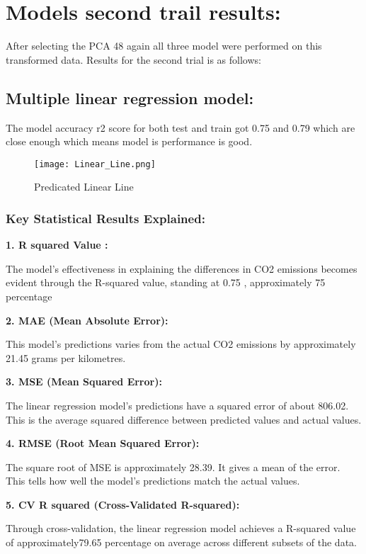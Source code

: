 \documentclass[12pt, a4paper,oneside]{book}
\numberwithin{equation}{section}
\begin{document}
\section{Models second trail results:}

After selecting the PCA 48 again all three model were performed on this transformed data. Results for the second trial is as follows:
\subsection{Multiple linear regression model:}

The model accuracy r2 score  for both test and train got 0.75 and 0.79 which are close enough which means model is performance is good.

\begin{figure}[H]
\centerline{\texttt{[image: Linear\_Line.png]}}
\caption{Predicated Linear Line}
\label{fig:4.2}
\end{figure}
\newpage
\subsubsection{Key Statistical Results Explained:}

\textbf{1. R squared Value :}

The model's effectiveness in explaining the differences in CO2 emissions becomes evident through the R-squared value, standing at 0.75 , approximately 75 percentage

\textbf{2. MAE (Mean Absolute Error):}

 This model's predictions varies from the actual CO2 emissions by approximately 21.45 grams per kilometres. 

\textbf{3. MSE (Mean Squared Error):}

The linear regression model's predictions have a squared error of about 806.02. This is the average squared difference between predicted values and actual values.

\textbf{4. RMSE (Root Mean Squared Error):}

 The square root of MSE is approximately 28.39. It gives a mean  of the error. This tells how well the model's predictions match the actual values.

\textbf{5. CV R squared (Cross-Validated R-squared):} 

Through cross-validation, the linear regression model achieves a R-squared value of approximately79.65 percentage on average across different subsets of the data. 
\end{document}
